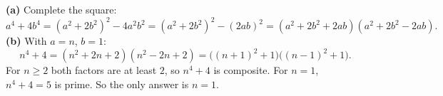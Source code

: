 \textbf{(a)} Complete the square:
\[
a^4+4b^4=(a^2+2b^2)^2-4a^2b^2=(a^2+2b^2)^2-(2ab)^2=(a^2+2b^2+2ab)(a^2+2b^2-2ab).
\]
\textbf{(b)} With $a=n$, $b=1$:
\[
n^4+4=(n^2+2n+2)(n^2-2n+2)=\bigl((n+1)^2+1\bigr)\bigl((n-1)^2+1\bigr).
\]
For $n\ge2$ both factors are at least $2$, so $n^4+4$ is composite. For $n=1$, $n^4+4=5$ is prime. So the only answer is $\boxed{n=1}$.
